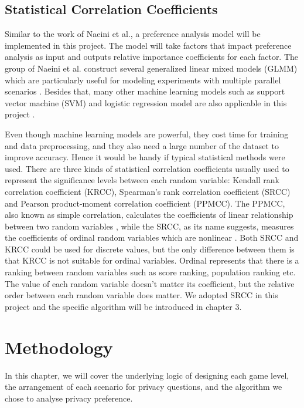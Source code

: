 \documentclass[msc,deptreport,ai]{infthesis}      %
\begin{document}
\section{Statistical Correlation Coefficients}

Similar to the work of Naeini et al., a preference analysis model will be implemented in this project. The model will take factors that impact preference analysis as input and outputs relative importance coefficients for each factor. The group of Naeini et al. construct several generalized linear mixed models (GLMM) which are particularly useful for modeling experiments with multiple parallel scenarios \cite{Naeini:2017}. Besides that, many other machine learning models such as support vector machine (SVM) and logistic regression model are also applicable in this project \cite{Steinwart2008SupportVM, Ng2001OnDV}.

Even though machine learning models are powerful, they cost time for training and data preprocessing, and they also need a large number of the dataset to improve accuracy. Hence it would be handy if typical statistical methods were used. There are three kinds of statistical correlation coefficients usually used to represent the significance levels between each random variable: Kendall rank correlation coefficient (KRCC), Spearman's rank correlation coefficient (SRCC) and Pearson product-moment correlation coefficient (PPMCC). The PPMCC, also known as simple correlation, calculates the coefficients of linear relationship between two random variables \cite{ref1}, while the SRCC, as its name suggests, measures the coefficients of ordinal random variables which are nonlinear \cite{Puka2011}. Both SRCC and KRCC could be used for discrete values, but the only difference between them is that KRCC is not suitable for ordinal variables. Ordinal represents that there is a ranking between random variables such as score ranking, population ranking etc. The value of each random variable doesn't matter its coefficient, but the relative order between each random variable does matter. We adopted SRCC in this project and the specific algorithm will be introduced in chapter 3.

\chapter{Methodology}

In this chapter, we will cover the underlying logic of designing each game level, the arrangement of each scenario for privacy questions, and the algorithm we chose to analyse privacy preference. 
\end{document}
